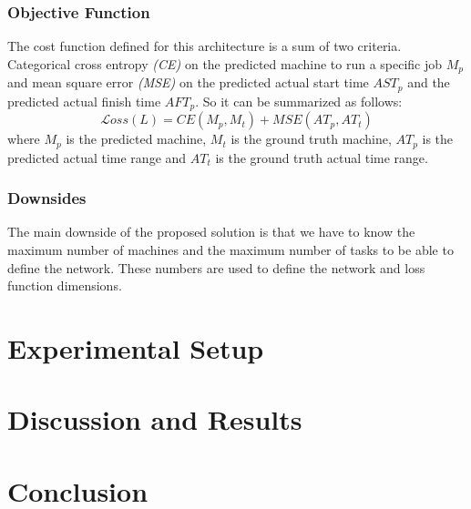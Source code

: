 \documentclass[twocolumn,11pt]{IEEEtran}
\begin{document}
\subsubsection{Objective Function}
The cost function defined for this architecture is a sum of two criteria. Categorical cross entropy \emph{(CE)} on the predicted machine to run a specific job $M_p$ and mean square error \emph{(MSE)} on the predicted actual start time $AST_p$ and the predicted actual finish time $AFT_p$. So it can be summarized as follows:
\begin{equation}
\mathcal Loss(L) = CE(M_p, M_t) + MSE(AT_p, AT_t)
\end{equation}
where $M_p$ is the predicted machine, $M_t$ is the ground truth machine, $AT_p$ is the predicted actual time range and $AT_t$ is the ground truth actual time range. \\

\subsubsection{Downsides}
The main downside of the proposed solution is that we have to know the maximum number of machines and the maximum number of tasks to be able to define the network. These numbers are used to define the network and loss function dimensions. 
    
\section{Experimental Setup}

\section{Discussion and Results}

\section{Conclusion}

\medskip



    
\end{document}
